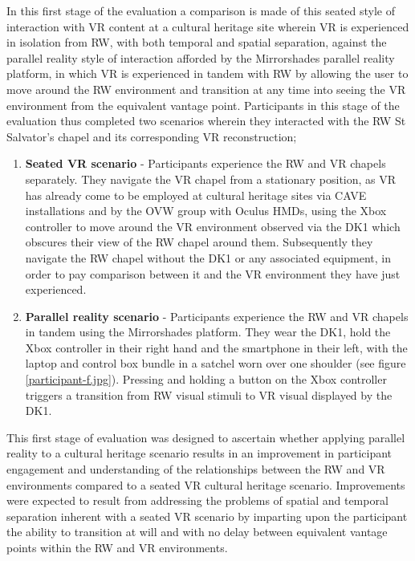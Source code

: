 In this first stage of the evaluation a comparison is made of this seated style of interaction with VR content at a cultural heritage site wherein VR is experienced in isolation from RW, with both temporal and spatial separation, against the parallel reality style of interaction afforded by the Mirrorshades parallel reality platform, in which VR is experienced in tandem with RW by allowing the user to move around the RW environment and transition at any time into seeing the VR environment from the equivalent vantage point. Participants in this stage of the evaluation thus completed two scenarios wherein they interacted with the RW St Salvator's chapel and its corresponding VR reconstruction;

\begin{enumerate}
	\item \textbf{Seated VR scenario} - Participants experience the RW and VR chapels separately. They navigate the VR chapel from a stationary position, as VR has already come to be employed at cultural heritage sites via CAVE installations and by the OVW group with Oculus HMDs, using the Xbox controller to move around the VR environment observed via the DK1 which obscures their view of the RW chapel around them. Subsequently they navigate the RW chapel without the DK1 or any associated equipment, in order to pay comparison between it and the VR environment they have just experienced.
	\item \textbf{Parallel reality scenario} - Participants experience the RW and VR chapels in tandem using the Mirrorshades platform. They wear the DK1, hold the Xbox controller in their right hand and the smartphone in their left, with the laptop and control box bundle in a satchel worn over one shoulder (see figure \ref{participant-f.jpg}). Pressing and holding a button on the Xbox controller triggers a transition from RW visual stimuli to VR visual displayed by the DK1.
\end{enumerate}

This first stage of evaluation was designed to ascertain whether applying parallel reality to a cultural heritage scenario results in an improvement in participant engagement and understanding of the relationships between the RW and VR environments compared to a seated VR cultural heritage scenario. Improvements were expected to result from addressing the problems of spatial and temporal separation inherent with a seated VR scenario by imparting upon the participant the ability to transition at will and with no delay between equivalent vantage points within the RW and VR environments.

